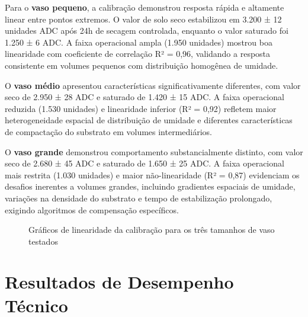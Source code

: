 \documentclass[twoside,english,brazilian]{UNISINOSmonografia}
\begin{document}
Para o \textbf{vaso pequeno}, a calibração demonstrou resposta rápida e altamente linear entre pontos extremos. O valor de solo seco estabilizou em 3.200 ± 12 unidades ADC após 24h de secagem controlada, enquanto o valor saturado foi 1.250 ± 6 ADC. A faixa operacional ampla (1.950 unidades) mostrou boa linearidade com coeficiente de correlação R² = 0,96, validando a resposta consistente em volumes pequenos com distribuição homogênea de umidade.

O \textbf{vaso médio} apresentou características significativamente diferentes, com valor seco de 2.950 ± 28 ADC e saturado de 1.420 ± 15 ADC. A faixa operacional reduzida (1.530 unidades) e linearidade inferior (R² = 0,92) refletem maior heterogeneidade espacial de distribuição de umidade e diferentes características de compactação do substrato em volumes intermediários.

O \textbf{vaso grande} demonstrou comportamento substancialmente distinto, com valor seco de 2.680 ± 45 ADC e saturado de 1.650 ± 25 ADC. A faixa operacional mais restrita (1.030 unidades) e maior não-linearidade (R² = 0,87) evidenciam os desafios inerentes a volumes grandes, incluindo gradientes espaciais de umidade, variações na densidade do substrato e tempo de estabilização prolongado, exigindo algoritmos de compensação específicos.

\begin{figure}[htbp]
\centering
\caption{Gráficos de linearidade da calibração para os três tamanhos de vaso testados}
\label{fig:graficos_linearidade}
\end{figure}

\section{Resultados de Desempenho Técnico}
\end{document}
